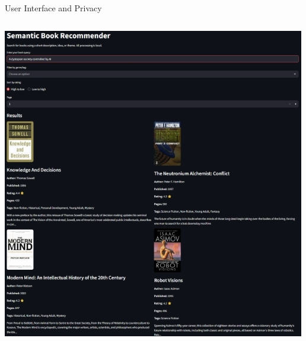 \begin{frame}{User Interface and Privacy}
\begin{columns}[T]
  \begin{column}{0.59\textwidth}
    \centering
    \includegraphics[scale=0.50]{figures/ui_screenshot.jpg}
  \end{column}
\end{columns}

\end{frame}
